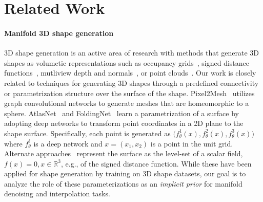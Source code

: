 \section{Related Work}
\paragraph*{Manifold 3D shape generation}
3D shape generation is an active area of research with methods that
generate 3D shapes as volumetic representations such as occupancy grids~\cite{choy20163d, 3dgan, prgan, drcTulsiani17, tatarchenko2017octree, hie3dcnn, matryoshka}, 
signed distance functions~\cite{chen2019learning,mescheder2019occupancy,genova2019learning,park2019deepsdf}, mutliview depth and normals~\cite{LunGKMW17, Soltani17, tatarchenko2016multi, lin2018learning}, or point clouds~\cite{pcagan, fan2016point, latentpc, mrt18}.
Our work is closely related to techniques for generating 3D shapes
through a
predefined connectivity or parametrization structure over the surface of the shape. 
Pixel2Mesh~\cite{pixel2mesh} utilizes graph convolutional
networks to generate meshes that are homeomorphic to a sphere.
AtlasNet~\cite{atlasnet} and
FoldingNet~\cite{yang2018foldingnet} learn a parametrization of a
surface by adopting deep networks to transform
point coordinates in a 2D plane to the shape surface.
Specifically, each point is generated as $\big(f^1_{\theta}(x),f^2_{\theta}(x),f^3_{\theta}(x)\big)$
where $f^i_\theta$ is a deep network and $x=(x_1,x_2)$ is a point
in the unit grid.
Alternate approaches~\cite{chen2019learning,mescheder2019occupancy,genova2019learning,park2019deepsdf} represent the surface as the level-set of
a scalar field, $f(x) = 0, x\in \mathbb{R}^3$, e.g., of the
signed distance function.
While these have been applied for shape generation by training on 3D shape datasets, our goal is to analyze the role of these parameterizations as an \emph{implicit prior} for manifold denoising and interpolation tasks.


